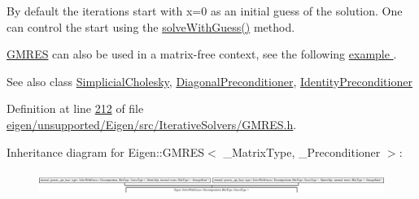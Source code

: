 By default the iterations start with x=0 as an initial guess of the solution. One can control the start using the \hyperlink{group___iterative_linear_solvers___module_adcc18d1ab283786dcbb5a3f63f4b4bd8}{solve\+With\+Guess()} method.

\hyperlink{group___iterative_linear_solvers___module_class_eigen_1_1_g_m_r_e_s}{G\+M\+R\+ES} can also be used in a matrix-\/free context, see the following \hyperlink{group___matrixfree_solver_example}{example }.

\begin{DoxySeeAlso}{See also}
class \hyperlink{group___sparse_cholesky___module_class_eigen_1_1_simplicial_cholesky}{Simplicial\+Cholesky}, \hyperlink{group___iterative_linear_solvers___module_class_eigen_1_1_diagonal_preconditioner}{Diagonal\+Preconditioner}, \hyperlink{group___iterative_linear_solvers___module_class_eigen_1_1_identity_preconditioner}{Identity\+Preconditioner} 
\end{DoxySeeAlso}


Definition at line \hyperlink{eigen_2unsupported_2_eigen_2src_2_iterative_solvers_2_g_m_r_e_s_8h_source_l00212}{212} of file \hyperlink{eigen_2unsupported_2_eigen_2src_2_iterative_solvers_2_g_m_r_e_s_8h_source}{eigen/unsupported/\+Eigen/src/\+Iterative\+Solvers/\+G\+M\+R\+E\+S.\+h}.

Inheritance diagram for Eigen\+:\+:G\+M\+R\+ES$<$ \+\_\+\+Matrix\+Type, \+\_\+\+Preconditioner $>$\+:\begin{figure}[H]
\begin{center}
\leavevmode
\includegraphics[height=0.815851cm]{group___iterative_linear_solvers___module}
\end{center}
\end{figure}
